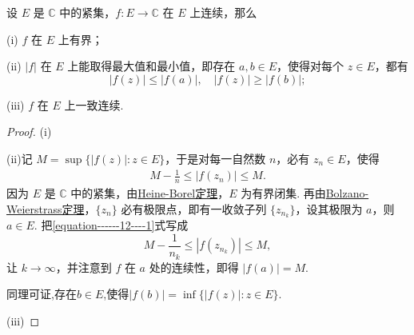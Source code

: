 \documentclass[../../main.tex]{subfiles}
\begin{document}
\begin{theorem}\label{theorem:连续的复变函数在紧集上的性质}
设 $E$ 是 $\mathbb{C}$ 中的紧集，$f: E \to \mathbb{C}$ 在 $E$ 上连续，那么

(i) $f$ 在 $E$ 上有界；

(ii) $|f|$ 在 $E$ 上能取得最大值和最小值，即存在 $a, b \in E$，使得对每个 $z \in E$，都有
\[
|f(z)| \leqslant |f(a)|, \quad |f(z)| \geqslant |f(b)|;
\]

(iii) $f$ 在 $E$ 上一致连续.
\end{theorem}
\begin{proof}
(i)

(ii)记 $M = \sup\{|f(z)|: z \in E\}$，于是对每一自然数 $n$，必有 $z_n \in E$，使得
\begin{align}\label{equation------12----1}
M - \frac{1}{n} \leqslant |f(z_n)| \leqslant M.
\end{align}
因为 $E$ 是 $\mathbb{C}$ 中的紧集，由\hyperref[theorem:Heine-Borel定理]{Heine-Borel定理}，$E$ 为有界闭集. 再由\hyperref[theorem:Bolzano-Weierstrass定理]{Bolzano-Weierstrass定理}，$\{z_n\}$ 必有极限点，即有一收敛子列 $\{z_{n_k}\}$，设其极限为 $a$，则 $a \in E$. 把\eqref{equation------12----1}式写成
\[
M - \frac{1}{n_k} \leqslant |f(z_{n_k})| \leqslant M,
\]
让 $k \to \infty$，并注意到 $f$ 在 $a$ 处的连续性，即得 $|f(a)| = M$. 

同理可证,存在$b\in E$,使得$|f(b)|=\inf\{|f(z)|:z\in E\}.$

(iii)
\end{proof}
\end{document}
